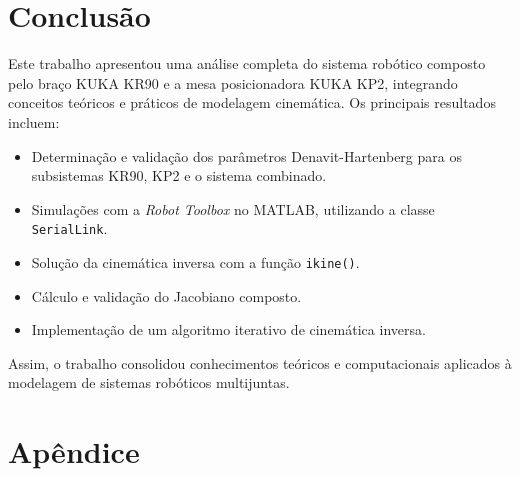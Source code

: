 \documentclass[10pt]{article}
\begin{document}
\section{Conclusão}

\quad Este trabalho apresentou uma análise completa do sistema robótico composto pelo braço KUKA KR90 e a mesa posicionadora KUKA KP2, integrando conceitos teóricos e práticos de modelagem cinemática. Os principais resultados incluem:

\begin{itemize}
    \item Determinação e validação dos parâmetros Denavit-Hartenberg para os subsistemas KR90, KP2 e o sistema combinado.
    \item Simulações com a \textit{Robot Toolbox} no MATLAB, utilizando a classe \texttt{SerialLink}.
    \item Solução da cinemática inversa com a função \texttt{ikine()}.
    \item Cálculo e validação do Jacobiano composto.
    \item Implementação de um algoritmo iterativo de cinemática inversa.
\end{itemize}

\quad Assim, o trabalho consolidou conhecimentos teóricos e computacionais aplicados à modelagem de sistemas robóticos multijuntas.

\newpage

\section*{Apêndice}
\end{document}

